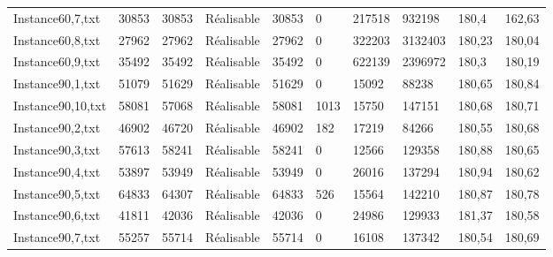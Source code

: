 \documentclass[a4paper,12pt]{article}
\theoremstyle{blueDefinition}
\theoremstyle{redProperty}
\begin{document}
\begin{table}[htbp]
\begin{tabular}{|l|p{40pt}|p{40pt}|p{55pt}|p{45pt}|p{35pt}|p{35pt}|p{35pt}|p{35pt}|p{35pt}|}
Instance60,7,txt   & 30853            & 30853               & Réalisable                & 30853              & 0          & 217518           & 932198               & 180,4            & 162,63               \\
Instance60,8,txt   & 27962            & 27962               & Réalisable                & 27962              & 0          & 322203           & 3132403              & 180,23           & 180,04               \\
Instance60,9,txt   & 35492            & 35492               & Réalisable                & 35492              & 0          & 622139           & 2396972              & 180,3            & 180,19               \\
Instance90,1,txt   & 51079            & 51629               & Réalisable                & 51629              & 0          & 15092            & 88238                & 180,65           & 180,84               \\
Instance90,10,txt  & 58081            & 57068               & Réalisable                & 58081              & 1013       & 15750            & 147151               & 180,68           & 180,71               \\
Instance90,2,txt   & 46902            & 46720               & Réalisable                & 46902              & 182        & 17219            & 84266                & 180,55           & 180,68               \\
Instance90,3,txt   & 57613            & 58241               & Réalisable                & 58241              & 0          & 12566            & 129358               & 180,88           & 180,65               \\
Instance90,4,txt   & 53897            & 53949               & Réalisable                & 53949              & 0          & 26016            & 137294               & 180,94           & 180,62               \\
Instance90,5,txt   & 64833            & 64307               & Réalisable                & 64833              & 526        & 15564            & 142210               & 180,87           & 180,78               \\
Instance90,6,txt   & 41811            & 42036               & Réalisable                & 42036              & 0          & 24986            & 129933               & 181,37           & 180,58               \\
Instance90,7,txt   & 55257            & 55714               & Réalisable                & 55714              & 0          & 16108            & 137342               & 180,54           & 180,69               \\

\end{tabular}
\end{table}
\end{document}
